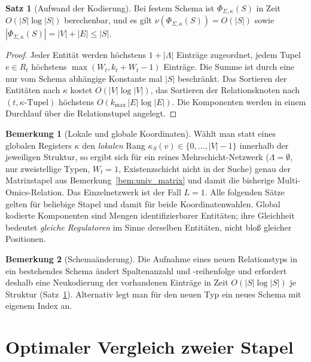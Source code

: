 \documentclass[a4paper,12pt, twoside]{report}
\theoremstyle{definition}
\newtheorem{satz}{Satz}
\newtheorem{bemerkung}{Bemerkung}
\begin{document}
\begin{satz}[Aufwand der Kodierung]
	\label{satz:univ_kodierung_zeit}
	Bei festem Schema ist $\Phi_{\Sigma,\kappa}(S)$ in Zeit $O(|S|\log|S|)$ berechenbar, und es gilt $\nu(\Phi_{\Sigma,\kappa}(S))=O(|S|)$ sowie $|\Phi_{\Sigma,\kappa}(S)|=|V|+|E|\le|S|$.
\end{satz}

\begin{proof}
	Jeder Entität werden höchstens $1+|\Lambda|$ Einträge zugeordnet, jedem Tupel $e\in R_t$ höchstens $\max(W_t,k_t+W_t-1)$ Einträge. Die Summe ist durch eine nur vom Schema abhängige Konstante mal $|S|$ beschränkt. Das Sortieren der Entitäten nach $\kappa$ kostet $O(|V|\log|V|)$, das Sortieren der Relationsknoten nach $(t,\kappa\text{-Tupel})$ höchstens $O(k_{\max}\,|E|\log|E|)$. Die Komponenten werden in einem Durchlauf über die Relationstupel angelegt.
\end{proof}

\begin{bemerkung}[Lokale und globale Koordinaten]
	\label{bem:univ_lokal}
	Wählt man statt eines globalen Registers $\kappa$ den \emph{lokalen} Rang $\kappa_S(v)\in\{0,\dots,|V|-1\}$ innerhalb der jeweiligen Struktur, so ergibt sich für ein reines Mehrschicht-Netzwerk ($\Lambda=\emptyset$, nur zweistellige Typen, $W_t=1$, Existenzschicht nicht in der Suche) genau der Matrixstapel aus Bemerkung~\ref{bem:univ_matrix} und damit die bisherige Multi-Omics-Relation. Das Einzelnetzwerk ist der Fall $L=1$. Alle folgenden Sätze gelten für beliebige Stapel und damit für beide Koordinatenwahlen. Global kodierte Komponenten sind Mengen identifizierbarer Entitäten; ihre Gleichheit bedeutet \emph{gleiche Regulatoren} im Sinne derselben Entitäten, nicht bloß gleicher Positionen.
\end{bemerkung}

\begin{bemerkung}[Schemaänderung]
	Die Aufnahme eines neuen Relationstyps in ein bestehendes Schema ändert Spaltenanzahl und -reihenfolge und erfordert deshalb eine Neukodierung der vorhandenen Einträge in Zeit $O(|S|\log|S|)$ je Struktur (Satz~\ref{satz:univ_kodierung_zeit}). Alternativ legt man für den neuen Typ ein neues Schema mit eigenem Index an.
\end{bemerkung}

\section{Optimaler Vergleich zweier Stapel}
\label{sec:univ_vergleich}
\end{document}
